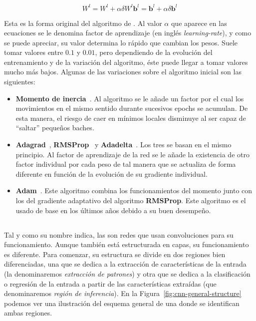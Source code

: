 \begin{subequations}
	\begin{equation}
		W^l = W^l + \alpha \delta W^l \label{eq:error-applied-to-weights}
	\end{equation}
	\begin{equation}
		\mathbf{b}^l = \mathbf{b}^l + \alpha \delta \mathbf{b}^l \label{eq:error-applied-to-bias}
	\end{equation}
\end{subequations}

Esta es la forma original del algoritmo de \textit{}. Al valor $\alpha$ que aparece en las ecuaciones se le denomina factor de aprendizaje (en inglés \textit{learning-rate}), y como se puede apreciar, su valor determina lo rápido que cambian los pesos. Suele tomar valores entre $0.1$ y $0.01$, pero dependiendo de la evolución del entrenamiento y de la variación del algoritmo, éste puede llegar a tomar valores mucho más bajos. Algunas de las variaciones sobre el algoritmo inicial son las siguientes:

\begin{itemize}
	\item \textbf{Momento de inercia}~\cite{qian1999momentum}. Al algoritmo se le añade un factor por el cual los movimientos en el mismo sentido durante sucesivos epochs se acumulan. De esta manera, el riesgo de caer en mínimos locales disminuye al ser capaz de \enquote{saltar} pequeños baches.
	\item \textbf{Adagrad}~\cite{duchi2011adaptive}, \textbf{RMSProp}~\cite{tieleman2012lecture} y \textbf{Adadelta}~\cite{zeiler2012adadelta}. Los tres se basan en el mismo principio. Al factor de aprendizaje de la red se le añade la existencia de otro factor individual por cada peso de tal manera que se actualiza de forma diferente en función de la evolución de su gradiente individual.
	\item \textbf{Adam}~\cite{kingma2014adam}. Este algoritmo combina los funcionamientos del momento junto con los del gradiente adaptativo del algoritmo \textbf{RMSProp}. Este algoritmo es el usado de base en los últimos años debido a su buen desempeño.
\end{itemize}

\subsection{}

Tal y como su nombre indica, las  son redes que usan convoluciones para su funcionamiento. Aunque también está estructurada en capas, su funcionamiento es diferente. Para comenzar, su estructura se divide en dos regiones bien diferenciadas, una que se dedica a la extracción de características de la entrada (la denominaremos \textit{extracción de patrones}) y otra que se dedica a la clasificación o regresión de la entrada a partir de las características extraídas (que denominaremos \textit{región de inferencia}). En la Figura~\ref{fig:cnn-general-structure} podemos ver una ilustración del esquema general de una  donde se identifican ambas regiones.

